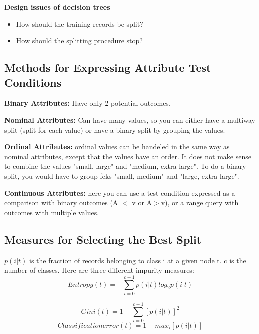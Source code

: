 		{\bf Design issues of decision trees}
			\begin{itemize}
				\item How should the training records be split?
				\item How should the splitting procedure stop?
			\end{itemize}

	\subsection{Methods for Expressing Attribute Test Conditions}

		{\bf Binary Attributes:} Have only 2 potential outcomes.

		{\bf Nominal Attributes:} Can have many values, so you can either have
		a multiway split (split for each value) or have a binary split by grouping
		the values. 

		{\bf Ordinal Attributes:} ordinal values can be handeled in the same way as
		nominal attributes, except that the values have an order. It does not make
		sense to combine the values "small, large" and "medium, extra large". To do
		a binary split, you would have to group feks "small, medium" and "large, extra large".

		{\bf Continuous Attributes:} here you can use a test condition expressed as a
		comparison with binary outcomes (A $<$ v or A$>$v), or a range query with outcomes 
		with multiple values. 

	\clearpage
	\subsection{Measures for Selecting the Best Split}
		$p(i|t)$ is the fraction of records belonging  to class i at a given node t.		
		c is the number of classes.
		Here are three different impurity measures: 
		\begin{equation}
			Entropy(t) = -\sum_{i=0}^{c-1} p(i|t)log_{2}p(i|t)
		\end{equation}

		\begin{equation}
			Gini(t) = 1 - \sum_{i=0}^{c-1}[p(i|t)]^{2}
		\end{equation}
		\begin{equation}
			Classification error(t) = 1 - max_{i}[p(i|t)]
		\end{equation}

